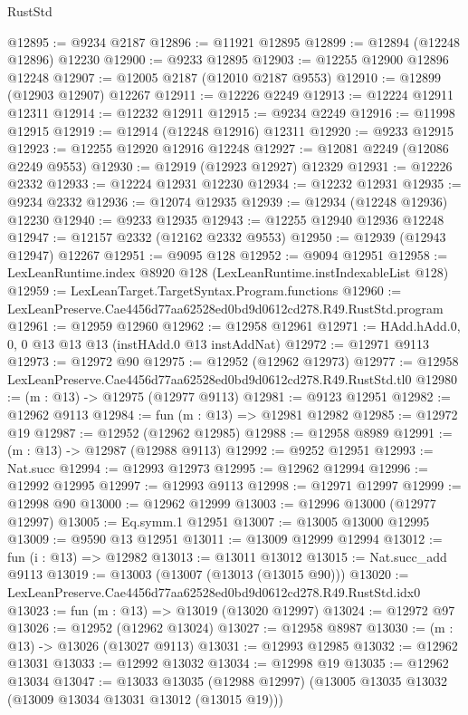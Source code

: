 \begin{lexlean}{RustStd}
\begin{coremodule}
@12895 := @9234 @2187
@12896 := @11921 @12895
@12899 := @12894 (@12248 @12896) @12230
@12900 := @9233 @12895
@12903 := @12255 @12900 @12896 @12248
@12907 := @12005 @2187 (@12010 @2187 @9553)
@12910 := @12899 (@12903 @12907) @12267
@12911 := @12226 @2249
@12913 := @12224 @12911 @12311
@12914 := @12232 @12911
@12915 := @9234 @2249
@12916 := @11998 @12915
@12919 := @12914 (@12248 @12916) @12311
@12920 := @9233 @12915
@12923 := @12255 @12920 @12916 @12248
@12927 := @12081 @2249 (@12086 @2249 @9553)
@12930 := @12919 (@12923 @12927) @12329
@12931 := @12226 @2332
@12933 := @12224 @12931 @12230
@12934 := @12232 @12931
@12935 := @9234 @2332
@12936 := @12074 @12935
@12939 := @12934 (@12248 @12936) @12230
@12940 := @9233 @12935
@12943 := @12255 @12940 @12936 @12248
@12947 := @12157 @2332 (@12162 @2332 @9553)
@12950 := @12939 (@12943 @12947) @12267
@12951 := @9095 @128
@12952 := @9094 @12951
@12958 := LexLeanRuntime.index @8920 @128 (LexLeanRuntime.instIndexableList @128)
@12959 := LexLeanTarget.TargetSyntax.Program.functions
@12960 := LexLeanPreserve.Cae4456d77aa62528ed0bd9d0612cd278.R49.RustStd.program
@12961 := @12959 @12960
@12962 := @12958 @12961
@12971 := HAdd.hAdd.{0, 0, 0} @13 @13 @13 (instHAdd.{0} @13 instAddNat)
@12972 := @12971 @9113
@12973 := @12972 @90
@12975 := @12952 (@12962 @12973)
@12977 := @12958 LexLeanPreserve.Cae4456d77aa62528ed0bd9d0612cd278.R49.RustStd.tl0
@12980 := (m : @13) -> @12975 (@12977 @9113)
@12981 := @9123 @12951
@12982 := @12962 @9113
@12984 := fun (m : @13) => @12981 @12982
@12985 := @12972 @19
@12987 := @12952 (@12962 @12985)
@12988 := @12958 @8989
@12991 := (m : @13) -> @12987 (@12988 @9113)
@12992 := @9252 @12951
@12993 := Nat.succ
@12994 := @12993 @12973
@12995 := @12962 @12994
@12996 := @12992 @12995
@12997 := @12993 @9113
@12998 := @12971 @12997
@12999 := @12998 @90
@13000 := @12962 @12999
@13003 := @12996 @13000 (@12977 @12997)
@13005 := Eq.symm.{1} @12951
@13007 := @13005 @13000 @12995
@13009 := @9590 @13 @12951
@13011 := @13009 @12999 @12994
@13012 := fun (i : @13) => @12982
@13013 := @13011 @13012
@13015 := Nat.succ_add @9113
@13019 := @13003 (@13007 (@13013 (@13015 @90)))
@13020 := LexLeanPreserve.Cae4456d77aa62528ed0bd9d0612cd278.R49.RustStd.idx0
@13023 := fun (m : @13) => @13019 (@13020 @12997)
@13024 := @12972 @97
@13026 := @12952 (@12962 @13024)
@13027 := @12958 @8987
@13030 := (m : @13) -> @13026 (@13027 @9113)
@13031 := @12993 @12985
@13032 := @12962 @13031
@13033 := @12992 @13032
@13034 := @12998 @19
@13035 := @12962 @13034
@13047 := @13033
    @13035
    (@12988 @12997)
    (@13005 @13035 @13032 (@13009 @13034 @13031 @13012 (@13015 @19)))

\end{coremodule}
\end{lexlean}
